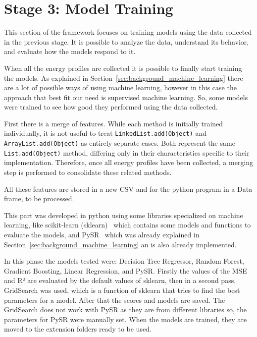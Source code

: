 \section{Stage 3: Model Training} \label{sec:work_stage3_model_training}

This section of the framework focuses on training models using the data collected in the previous stage. It is possible to analyze the data, understand its behavior, and evaluate how the models respond to it.

When all the energy profiles are collected it is possible to finally start training the models. As explained in Section~\ref{sec:background_machine_learning} there are a lot of possible ways of using machine learning, however in this case the approach that best fit our need is supervised machine learning. So, some models were trained to see how good they performed using the data collected.

First there is a merge of features. While each method is initially trained individually, it is not useful to treat \texttt{LinkedList.add(Object)} and \texttt{ArrayList.add(Object)} as entirely separate cases. Both represent the same \texttt{List.add(Object)} method, differing only in their characteristics specific to their implementation. Therefore, once all energy profiles have been collected, a merging step is performed to consolidate these related methods.

All these features are stored in a new CSV and for the python program in a Data frame, to be processed.

This part was developed in python using some libraries specialized on machine learning, like scikit-learn (sklearn)~\cite{scikit-learn} which contains some models and functions to evaluate the models, and PySR~\cite{cranmer2023interpretablemachinelearningscience} which was already explained in Section~\ref{sec:background_machine_learning} an is also already implemented.

In this phase the models tested were: Decision Tree Regressor, Random Forest, Gradient Boosting, Linear Regression, and PySR. Firstly the values of the MSE and R² are evaluated by the default values of sklearn, then in a second pass, GridSearch was used, which is a function of sklearn that tries to find the best parameters for a model. After that the scores and models are saved. The GridSearch does not work with PySR as they are from different libraries so, the parameters for PySR were manually set. When the models are trained, they are moved to the extension folders ready to be used.


